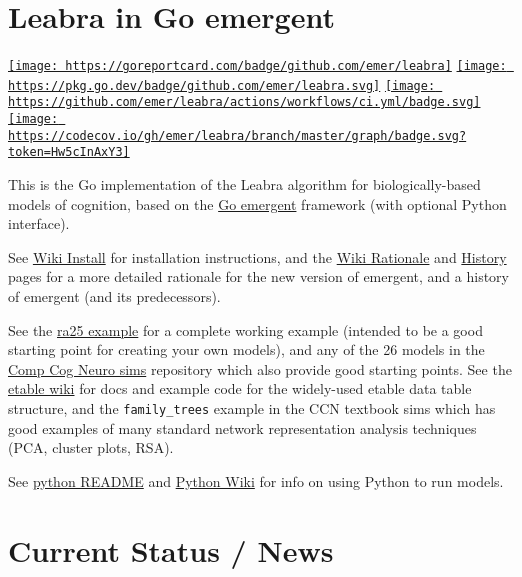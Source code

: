 \hypertarget{leabra-in-go-emergent}{%
\section{Leabra in Go emergent}\label{leabra-in-go-emergent}}

\href{https://goreportcard.com/report/github.com/emer/leabra}{\texttt{[image: https://goreportcard.com/badge/github.com/emer/leabra]}}
\href{https://pkg.go.dev/github.com/emer/leabra}{\texttt{[image: https://pkg.go.dev/badge/github.com/emer/leabra.svg]}}
\href{https://github.com/emer/leabra/actions/workflows/ci.yml}{\texttt{[image: https://github.com/emer/leabra/actions/workflows/ci.yml/badge.svg]}}
\href{https://codecov.io/gh/emer/leabra}{\texttt{[image: https://codecov.io/gh/emer/leabra/branch/master/graph/badge.svg?token=Hw5cInAxY3]}}

This is the Go implementation of the Leabra algorithm for
biologically-based models of cognition, based on the
\href{https://github.com/emer/emergent}{Go emergent} framework (with
optional Python interface).

See \href{https://github.com/emer/emergent/wiki/Install}{Wiki Install}
for installation instructions, and the
\href{https://github.com/emer/emergent/wiki/Rationale}{Wiki Rationale}
and \href{https://github.com/emer/emergent/wiki/History}{History} pages
for a more detailed rationale for the new version of emergent, and a
history of emergent (and its predecessors).

See the
\href{https://github.com/emer/leabra/blob/master/examples/ra25/README.md}{ra25
example} for a complete working example (intended to be a good starting
point for creating your own models), and any of the 26 models in the
\href{https://github.com/CompCogNeuro/sims}{Comp Cog Neuro sims}
repository which also provide good starting points. See the
\href{https://github.com/emer/etable/wiki}{etable wiki} for docs and
example code for the widely-used etable data table structure, and the
\texttt{family\_trees} example in the CCN textbook sims which has good
examples of many standard network representation analysis techniques
(PCA, cluster plots, RSA).

See
\href{https://github.com/emer/leabra/blob/master/python/README.md}{python
README} and \href{https://github.com/emer/emergent/wiki/Python}{Python
Wiki} for info on using Python to run models.

\hypertarget{current-status--news}{%
\section{Current Status / News}\label{current-status--news}}

